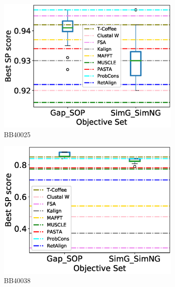 \begin{figure}[!htbp]
\begin{adjustwidth}{-1.5cm}{-1cm}
\begin{subfigure}{0.22\textwidth}
			\includegraphics[width=\columnwidth]{Figure/summary/precomputedInit/Balibase/BB40025_objset_pairs_rank_2}
			\caption{BB40025}
		\end{subfigure}
		\begin{subfigure}{0.22\textwidth}
			\includegraphics[width=\columnwidth]{Figure/summary/precomputedInit/Balibase/BB40038_objset_pairs_rank_2}
			\caption{BB40038}
		\end{subfigure}
		\begin{subfigure}{0.22\textwidth}

\end{subfigure}
\end{adjustwidth}
\end{figure}
